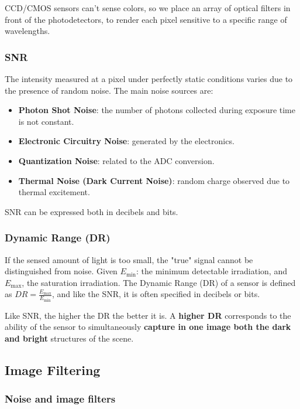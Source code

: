 \documentclass{article}
\begin{document}
CCD/CMOS sensors can't sense colors, so we place an array of optical filters in front of the photodetectors, to render each pixel sensitive to a specific range of wavelengths.

\subsubsection{SNR}

The intensity measured at a pixel under perfectly static conditions varies due to the presence of random noise.
The main noise sources are:
\begin{itemize}
  \item \textbf{Photon Shot Noise}: the number of photons collected during exposure time is not constant.
  \item \textbf{Electronic Circuitry Noise}: generated by the electronics.
  \item \textbf{Quantization Noise}: related to the ADC conversion.
  \item \textbf{Thermal Noise (Dark Current Noise)}: random charge observed due to thermal excitement.
\end{itemize}

SNR can be expressed both in decibels and bits.

\subsubsection{Dynamic Range (DR)}
If the sensed amount of light is too small, the "true" signal cannot be distinguished from noise.
Given $E_{\text{min}}$: the minimum detectable irradiation, and $E_{\text{max}}$, the saturation irradiation.
The Dynamic Range (DR) of a sensor is defined as $DR = \frac{E_{\text{max}}}{E_{\text{min}}}$, and like the SNR, it is often specified in decibels or bits.

Like SNR, the higher the DR the better it is.
A \textbf{higher DR} corresponds to the ability of the sensor to simultaneously \textbf{capture in one image both the dark and bright} structures of the scene.

\subsection{Image Filtering}

\subsubsection{Noise and image filters}
\end{document}
